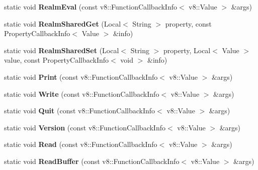 \begin{DoxyCompactItemize}
\item 
\hypertarget{classv8_1_1_shell_a2188e58aebf24a2991a9e5a8c6cc457c}{}static void {\bfseries Realm\+Eval} (const v8\+::\+Function\+Callback\+Info$<$ v8\+::\+Value $>$ \&args)\label{classv8_1_1_shell_a2188e58aebf24a2991a9e5a8c6cc457c}

\item 
\hypertarget{classv8_1_1_shell_a18a4d640a41f7fdc9a178e3db8408a8f}{}static void {\bfseries Realm\+Shared\+Get} (Local$<$ String $>$ property, const Property\+Callback\+Info$<$ Value $>$ \&info)\label{classv8_1_1_shell_a18a4d640a41f7fdc9a178e3db8408a8f}

\item 
\hypertarget{classv8_1_1_shell_a88d66b6299a850963f0fc2226e19c157}{}static void {\bfseries Realm\+Shared\+Set} (Local$<$ String $>$ property, Local$<$ Value $>$ value, const Property\+Callback\+Info$<$ void $>$ \&info)\label{classv8_1_1_shell_a88d66b6299a850963f0fc2226e19c157}

\item 
\hypertarget{classv8_1_1_shell_a7b8bdce48fa4a1b5e9ce8df50fc0a655}{}static void {\bfseries Print} (const v8\+::\+Function\+Callback\+Info$<$ v8\+::\+Value $>$ \&args)\label{classv8_1_1_shell_a7b8bdce48fa4a1b5e9ce8df50fc0a655}

\item 
\hypertarget{classv8_1_1_shell_afd3888490889c1e9be9599cf4a2bad4f}{}static void {\bfseries Write} (const v8\+::\+Function\+Callback\+Info$<$ v8\+::\+Value $>$ \&args)\label{classv8_1_1_shell_afd3888490889c1e9be9599cf4a2bad4f}

\item 
\hypertarget{classv8_1_1_shell_a0ba86babc520a8e061820fab8fbccbbb}{}static void {\bfseries Quit} (const v8\+::\+Function\+Callback\+Info$<$ v8\+::\+Value $>$ \&args)\label{classv8_1_1_shell_a0ba86babc520a8e061820fab8fbccbbb}

\item 
\hypertarget{classv8_1_1_shell_a67d9a8c0c96e9cf9a6bb22703ad019e7}{}static void {\bfseries Version} (const v8\+::\+Function\+Callback\+Info$<$ v8\+::\+Value $>$ \&args)\label{classv8_1_1_shell_a67d9a8c0c96e9cf9a6bb22703ad019e7}

\item 
\hypertarget{classv8_1_1_shell_a05de5538b7e495ce8402923d15b16512}{}static void {\bfseries Read} (const v8\+::\+Function\+Callback\+Info$<$ v8\+::\+Value $>$ \&args)\label{classv8_1_1_shell_a05de5538b7e495ce8402923d15b16512}

\item 
\hypertarget{classv8_1_1_shell_a35d2c0d84ddc58b9b51745d47d9acc25}{}static void {\bfseries Read\+Buffer} (const v8\+::\+Function\+Callback\+Info$<$ v8\+::\+Value $>$ \&args)\label{classv8_1_1_shell_a35d2c0d84ddc58b9b51745d47d9acc25}


\end{DoxyCompactItemize}
